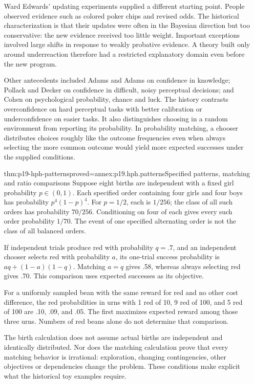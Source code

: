 Ward Edwards' updating experiments supplied a different starting point.
People observed evidence such as colored poker chips and revised odds.
The historical characterization is that their updates were often in the
Bayesian direction but too conservative: the new evidence received too
little weight. Important exceptions involved large shifts in response to
weakly probative evidence. A theory built only around underreaction
therefore had a restricted explanatory domain even before the new program.

Other antecedents included Adams and Adams on confidence in knowledge;
Pollack and Decker on confidence in difficult, noisy perceptual decisions;
and Cohen on psychological probability, chance and luck. The history
contrasts overconfidence on hard perceptual tasks with better calibration
or underconfidence on easier tasks. It also distinguishes choosing in a
random environment from reporting its probability. In probability
matching, a chooser distributes choices roughly like the outcome
frequencies even when always selecting the more common outcome would
yield more expected successes under the supplied conditions.

\begin{hblemma}{thm:p19-hph-patterns}{proved=annex:p19.hph.patterns}{Specified patterns, matching and ratio comparisons}
Suppose eight births are independent with a fixed girl probability
\(p\in(0,1)\). Each specified order containing four girls and four
boys has probability \(p^4(1-p)^4\). For \(p=1/2\), each is
\(1/256\); the class of all such orders has probability \(70/256\).
Conditioning on four of each gives every such order probability \(1/70\).
The event of one specified alternating order is not the class of all
balanced orders.

If independent trials produce red with probability \(q=.7\), and an
independent chooser selects red with probability \(a\), its one-trial
success probability is \(aq+(1-a)(1-q)\). Matching \(a=q\)
gives .58, whereas always selecting red gives .70. This comparison
uses expected successes as its objective.

For a uniformly sampled bean with the same reward for red and no other
cost difference, the red probabilities in urns with 1 red of 10,
9 red of 100, and 5 red of 100 are .10, .09, and .05. The first
maximizes expected reward among those three urns. Numbers of red beans
alone do not determine that comparison.
\end{hblemma}

The birth calculation does not assume actual births are independent and
identically distributed. Nor does the matching calculation prove that
every matching behavior is irrational: exploration, changing contingencies,
other objectives or dependencies change the problem. These conditions
make explicit what the historical toy examples require.

